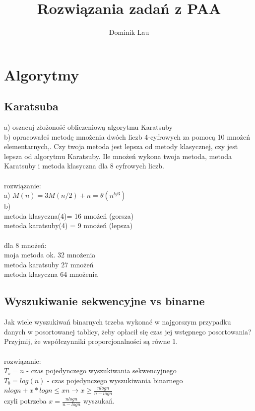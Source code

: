 \documentclass{article}
\title{Rozwiązania zadań z PAA}
\author{Dominik Lau}
\begin{document}
\maketitle
\tableofcontents

\section{Algorytmy}
\subsection*{Karatsuba}
a) oszacuj złożoność obliczeniową algorytmu Karatsuby \\
b) opracowałeś metodę mnożenia dwóch liczb 4-cyfrowych za pomocą 10 mnożeń elementarnych,.
Czy twoja metoda jest  lepsza od metody klasycznej, czy jest lepsza od algorytmu Karatsuby.
Ile mnożeń wykona twoja metoda, metoda Karatsuby i metoda klasyczna dla 8 cyfrowych liczb. \\\\
rozwiązanie:\\
a) $M(n) = 3M(n/2) + n = \theta(n^{lg3})$ \\
b) \\
metoda klasyczna(4)= 16 mnożeń (gorsza) \\
metoda karatsuby(4) = 9 mnożeń  (lepsza) \\\\
dla 8 mnożeń: \\
moja metoda ok. 32 mnożenia \\
metoda karatsuby 27 mnożeń \\
metoda klasyczna 64 mnożenia 

\subsection*{Wyszukiwanie sekwencyjne vs binarne}
Jak wiele wyszukiwań binarnych trzeba wykonać w najgorszym przypadku danych w posortowanej tablicy, żeby opłacił się czas jej wstępnego posortowania?
Przyjmij, że współczynniki proporcjonalności są równe 1. \\\\rozwiązanie:\\
$T_s = n$ - czas pojedynczego wyszukiwania sekwencyjnego\\
$T_b = log(n)$ - czas pojedynczego wyszukiwania binarnego\\
$nlogn + x * logn \leq xn \rightarrow x \geq \frac{nlogn}{n-logn}$ \\
czyli potrzeba $x = \frac{nlogn}{n-logn}$ wyszukań.
\end{document}
